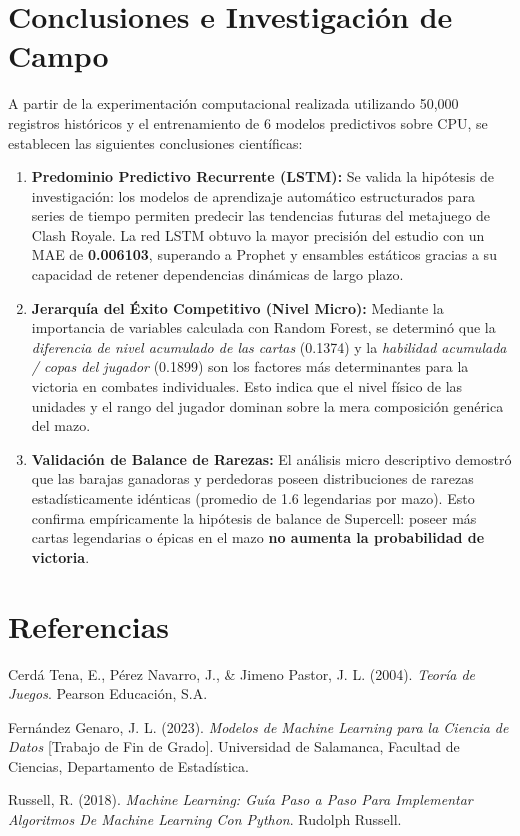 \documentclass[
  spanish,
  12pt,
]{report}
\newlength{\cslhangindent}
\newenvironment{CSLReferences}[2] %
 {\begin{list}{}{%
  \setlength{\itemindent}{0pt}
  \setlength{\leftmargin}{0pt}
  \setlength{\parsep}{0pt}
  \ifodd #1
   \setlength{\leftmargin}{\cslhangindent}
   \setlength{\itemindent}{-1\cslhangindent}
  \fi
  \setlength{\itemsep}{#2\baselineskip}}}
 {\end{list}}
\providecommand{\tightlist}{%
  \setlength{\itemsep}{0pt}\setlength{\parskip}{0pt}}
\begin{document}
\chapter{Conclusiones e Investigación de
Campo}\label{conclusiones-e-investigaciuxf3n-de-campo}

A partir de la experimentación computacional realizada utilizando 50,000
registros históricos y el entrenamiento de 6 modelos predictivos sobre
CPU, se establecen las siguientes conclusiones científicas:

\begin{enumerate}
\def\labelenumi{\arabic{enumi}.}
\tightlist
\item
  \textbf{Predominio Predictivo Recurrente (LSTM):} Se valida la
  hipótesis de investigación: los modelos de aprendizaje automático
  estructurados para series de tiempo permiten predecir las tendencias
  futuras del metajuego de Clash Royale. La red LSTM obtuvo la mayor
  precisión del estudio con un MAE de \textbf{0.006103}, superando a
  Prophet y ensambles estáticos gracias a su capacidad de retener
  dependencias dinámicas de largo plazo.
\item
  \textbf{Jerarquía del Éxito Competitivo (Nivel Micro):} Mediante la
  importancia de variables calculada con Random Forest, se determinó que
  la \emph{diferencia de nivel acumulado de las cartas} (0.1374) y la
  \emph{habilidad acumulada / copas del jugador} (0.1899) son los
  factores más determinantes para la victoria en combates individuales.
  Esto indica que el nivel físico de las unidades y el rango del jugador
  dominan sobre la mera composición genérica del mazo.
\item
  \textbf{Validación de Balance de Rarezas:} El análisis micro
  descriptivo demostró que las barajas ganadoras y perdedoras poseen
  distribuciones de rarezas estadísticamente idénticas (promedio de 1.6
  legendarias por mazo). Esto confirma empíricamente la hipótesis de
  balance de Supercell: poseer más cartas legendarias o épicas en el
  mazo \textbf{no aumenta la probabilidad de victoria}.
\end{enumerate}

\chapter*{Referencias}\label{referencias}

\protect{}\label{refs}
\begin{CSLReferences}{1}{0}
Cerdá Tena, E., Pérez Navarro, J., \& Jimeno Pastor, J. L. (2004).
\emph{Teoría de Juegos}. Pearson Educación, S.A.

Fernández Genaro, J. L. (2023). \emph{Modelos de Machine Learning para
la Ciencia de Datos} {[}Trabajo de Fin de Grado{]}. Universidad de
Salamanca, Facultad de Ciencias, Departamento de Estadística.

Russell, R. (2018). \emph{Machine Learning: Guía Paso a Paso Para
Implementar Algoritmos De Machine Learning Con Python}. Rudolph Russell.

\end{CSLReferences}
\end{document}
